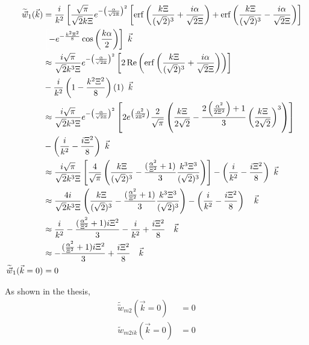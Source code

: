 \documentclass[double,12pt]{beavtex}
\begin{document}
\begin{align}
   \widetilde{\vec{w}}_1(\vec{k}) &= \frac{i}{k^2}\left[\frac{\sqrt{\pi}}
   {\sqrt{2}k\Xi}
   e^{-\left(\frac{\alpha}{\sqrt{2}\Xi}\right)^2}\left[\operatorname{erf}
   \left(\frac{k\Xi}{(\sqrt{2})^3}+\frac{i\alpha}{\sqrt{2}\Xi}\right)
   +\operatorname{erf}\left(\frac{k\Xi}{(\sqrt{2})^3}-\frac{i\alpha}
   {\sqrt{2}\Xi}
   \right)\right]\color{white}\right]\color{black}  \nonumber \\
 & \color{white}\left[\color{black}-e^{-\frac{k^2\Xi^2}{8}}\cos\left(
    \frac{k\alpha}{2}\right)\right]{~}\color{black}\vec{k} \\
    & \approx  \frac{i\sqrt{\pi}}{\sqrt{2}k^3\Xi}e^{-\left(\frac{\alpha}
    {\sqrt{2}\Xi}\right)^2}\left[2\operatorname{Re}\left(\operatorname{erf}
    \left(\frac{k\Xi}{(\sqrt{2})^3}+\frac{i\alpha}{\sqrt{2}\Xi}\right)
    \right)\right] \nonumber \\
    &-\frac{i}{k^2}\left(1-\frac{k^2\Xi^2}{8}\right)\left(1\right) 
    {~}\vec{k} \\
    & \approx  \frac{i\sqrt{\pi}}{\sqrt{2}k^3\Xi}e^{-\left(\frac{\alpha}
    {\sqrt{2}\Xi}\right)^2}\left[2e^{\left(\frac{\alpha^2}{2\Xi^2}\right)}
    \frac{2}{\sqrt{\pi}}   \left(\frac{k\Xi}{2\sqrt{2}}   -\frac{2\left(
    \frac{\alpha^2}{2\Xi^2}\right)+1}{3}\left(\frac{k\Xi}{2\sqrt{2}}
    \right)^3\right)\right] \nonumber \\
    &-\left(\frac{i}{k^2}-\frac{i\Xi^2}{8}\right) {~}\vec{k}\\
    & \approx  \frac{i\sqrt{\pi}}{\sqrt{2}k^3\Xi}\left[\frac{4}{\sqrt{\pi}}
    \left(\frac{k\Xi}{(\sqrt{2})^3} -\frac{(\frac{\alpha^2}{\Xi^2}+1)}{3}
    \frac{k^3\Xi^3}{(\sqrt{2})^3}\right)\right] -\left(\frac{i}{k^2}
    -\frac{i\Xi^2}{8}\right) {~}\vec{k}\\
    & \approx  \frac{4i}{\sqrt{2}k^3\Xi}\left(\frac{k\Xi}{(\sqrt{2})^3} 
    -\frac{(\frac{\alpha^2}{\Xi^2}+1)}{3}\frac{k^3\Xi^3}{(\sqrt{2})^3}
    \right)-\left(\frac{i}{k^2}-\frac{i\Xi^2}{8}\right) {~~~}\vec{k}\\
    & \approx  \frac{i}{k^2} -\frac{(\frac{\alpha^2}{\Xi^2}+1)i\Xi^2}{3}
    -\frac{i}{k^2}+\frac{i\Xi^2}{8} {~~~}\vec{k}\\
    & \approx  -\frac{(\frac{\alpha^2}{\Xi^2}+1)i\Xi^2}{3}
    +\frac{i\Xi^2}{8} {~~~}\vec{k}\\
     \widetilde{\vec w}_1(\vec k=0) &= 0 
\end{align}

As shown in the thesis,
\begin{align}
  \widetilde{\overleftrightarrow w}_{m2}(\vec k=0) &= 0  \\
  \widetilde w_{m2ik}(\vec k = 0) &= 0
\end{align}
\end{document}
